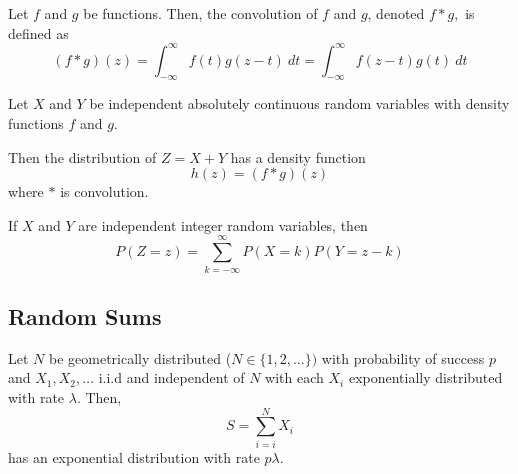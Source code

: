 \begin{defn}[Convolution]
Let $f$ and $g$ be functions. Then, the convolution of $f$ and $g$, denoted $f * g,$ is defined as
$$
(f * g)(z) = \int_{-\infty}^\infty f(t) g(z - t)~dt =  \int_{-\infty}^\infty f(z - t) g(t)~dt
$$
\end{defn}

\begin{theorem}
Let $X$ and $Y$ be independent absolutely continuous random variables with density functions $f$ and $g$.

Then the distribution of $Z = X + Y$ has a density function
$$
h(z) = (f * g)(z)
$$
where $*$ is convolution.

If $X$ and $Y$ are independent integer random variables, then
$$
P(Z = z) = \sum_{k = -\infty}^\infty P(X = k) P(Y = z - k)
$$
\end{theorem}



\subsection{Random Sums}

\begin{theorem} \label{thm:geom_sum_exp}
Let $N$ be geometrically distributed ($N \in \{1,2,\ldots\})$ with probability of success $p$ and $X_1,X_2,\ldots$ i.i.d and independent of $N$ with each $X_i$ exponentially distributed with rate $\lambda$.
Then,
$$
S = \sum_{i = i}^N X_i
$$
has an exponential distribution with rate $p \lambda$.
\end{theorem}

